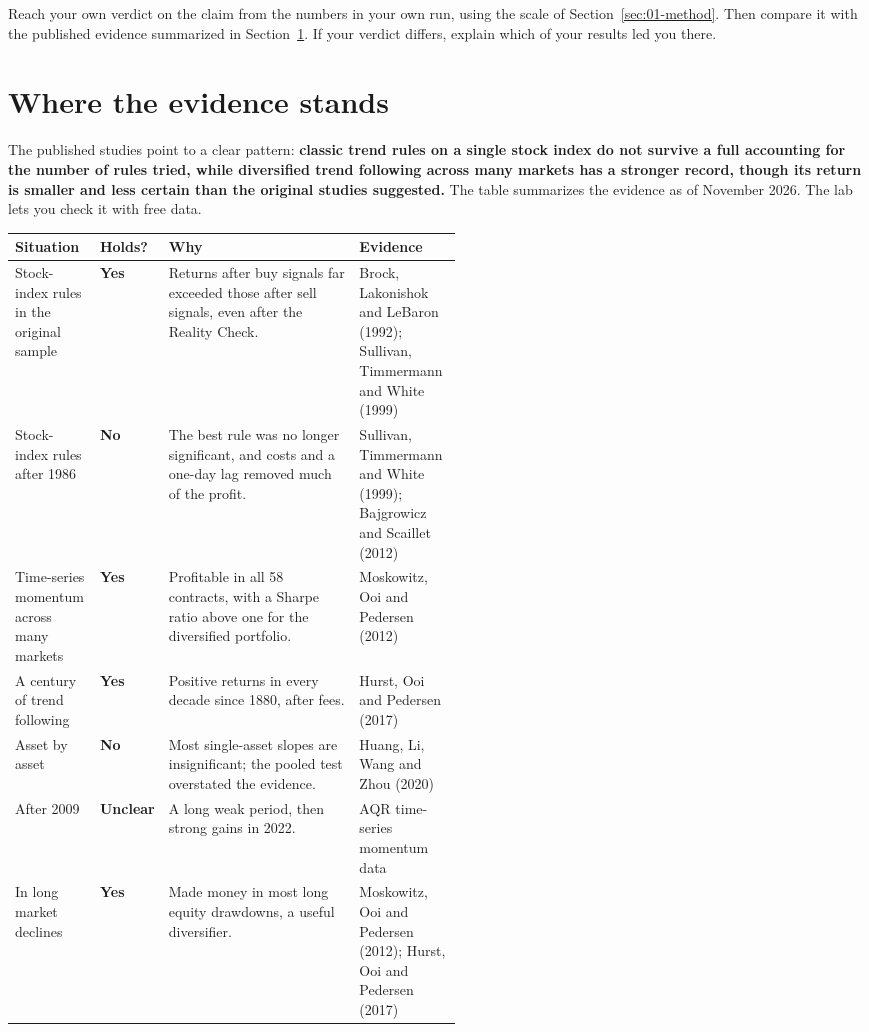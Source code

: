 Reach your own verdict on the claim from the numbers in your own run, using the scale of Section~\ref{sec:01-method}. Then compare it with the published evidence summarized in Section~\ref{sec:08-verdict}. If your verdict differs, explain which of your results led you there.

\section{Where the evidence stands}
\label{sec:08-verdict}

The published studies point to a clear pattern: \textbf{classic trend rules on a single stock index do not survive a full accounting for the number of rules tried, while diversified trend following across many markets has a stronger record, though its return is smaller and less certain than the original studies suggested.} The table summarizes the evidence as of November 2026. The lab lets you check it with free data.

\begin{center}
\small
\begin{tabularx}{\linewidth}{@{}>{\raggedright\arraybackslash}p{0.19\linewidth}>{\raggedright\arraybackslash}p{0.10\linewidth}>{\raggedright\arraybackslash}X>{\raggedright\arraybackslash}p{0.23\linewidth}@{}}
\toprule
Situation & Holds? & Why & Evidence \\
\midrule
Stock-index rules in the original sample & \textbf{Yes} & Returns after buy signals far exceeded those after sell signals, even after the Reality Check. & Brock, Lakonishok and LeBaron (1992); Sullivan, Timmermann and White (1999) \\
\addlinespace[3pt]
Stock-index rules after 1986 & \textbf{No} & The best rule was no longer significant, and costs and a one-day lag removed much of the profit. & Sullivan, Timmermann and White (1999); Bajgrowicz and Scaillet (2012) \\
\addlinespace[3pt]
Time-series momentum across many markets & \textbf{Yes} & Profitable in all 58 contracts, with a Sharpe ratio above one for the diversified portfolio. & Moskowitz, Ooi and Pedersen (2012) \\
\addlinespace[3pt]
A century of trend following & \textbf{Yes} & Positive returns in every decade since 1880, after fees. & Hurst, Ooi and Pedersen (2017) \\
\addlinespace[3pt]
Asset by asset & \textbf{No} & Most single-asset slopes are insignificant; the pooled test overstated the evidence. & Huang, Li, Wang and Zhou (2020) \\
\addlinespace[3pt]
After 2009 & \textbf{Unclear} & A long weak period, then strong gains in 2022. & AQR time-series momentum data \\
\addlinespace[3pt]
In long market declines & \textbf{Yes} & Made money in most long equity drawdowns, a useful diversifier. & Moskowitz, Ooi and Pedersen (2012); Hurst, Ooi and Pedersen (2017) \\
\bottomrule
\end{tabularx}
\end{center}


